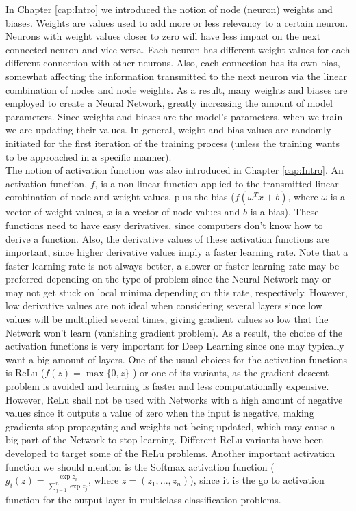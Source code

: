 In Chapter \ref{cap:Intro} we introduced the notion of node (neuron) weights and biases. Weights are values used to add more or less relevancy to a certain neuron. Neurons with weight values closer to zero will have less impact on the next connected neuron and vice versa. Each neuron has different weight values for each different connection with other neurons. Also, each connection has its own bias, somewhat affecting the information transmitted to the next neuron via the linear combination of nodes and node weights. As a result, many weights and biases are employed to create a Neural Network, greatly increasing the amount of model parameters. Since weights and biases are the model's parameters, when we train we are updating their values. In general, weight and bias values are randomly initiated for the first iteration of the training process (unless the training wants to be approached in a specific manner).\\

The notion of activation function was also introduced in Chapter \ref{cap:Intro}. An activation function, $f$, is a non linear function applied to the transmitted linear combination of node and weight values, plus the bias ($f( \omega^T x + b )$, where $\omega$ is a vector of weight values, $x$ is a vector of node values and $b$ is a bias). These functions need to have easy derivatives, since computers don't know how to derive a function. Also, the derivative values of these activation functions are important, since higher derivative values imply a faster learning rate. Note that a faster learning rate is not always better, a slower or faster learning rate may be preferred depending on the type of problem since the Neural Network may or may not get stuck on local minima depending on this rate, respectively. However, low derivative values are not ideal when considering several layers since low values will be multiplied several times, giving gradient values so low that the Network won't learn (vanishing gradient problem). As a result, the choice of the activation functions is very important for Deep Learning since one may typically want a big amount of layers. One of the usual choices for the activation functions is ReLu ($f(z) = \max\{0,z\}$
) or one of its variants, as the gradient descent problem is avoided and learning is faster and less computationally expensive. However, ReLu shall not be used with Networks with a high amount of negative values since it outputs a value of zero when the input is negative, making gradients stop propagating and weights not being updated, which may cause a big part of the Network to stop learning. Different ReLu variants have been developed to target some of the ReLu problems. Another important activation function we should mention is the Softmax activation function ($g_i( z ) = \frac{\exp{z_i}}{\sum_{j=1}^{n}{\exp{z_j}}}$, where $z = (z_1, ..., z_n)$), since it is the go to activation function for the output layer in multiclass classification problems.\\

